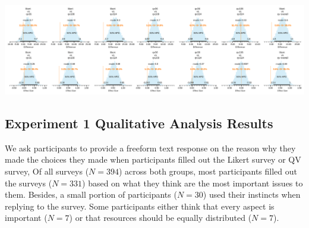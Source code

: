 \begin{landscape}
    \centering
    \includegraphics[width=1.4\textwidth, keepaspectratio=true]{content/image/Votes_vs_Absolute_Donation_StudentT_differences_and_effects.pdf}
    \label{fig:contrast_exp1}
\end{landscape}
    
\subsection{Experiment 1 Qualitative Analysis Results}\label{results-1-qual}
We ask participants to provide a freeform text response on the reason why they made the choices they made
when participants filled out the Likert survey or QV survey,
Of all surveys ($N=394$) across both groups, most participants filled out the surveys ($N=331$) based on what they think are the most important issues to them. %
Besides, a small portion of participants ($N=30$) used their instincts when replying to the survey.
Some participants either think that every aspect is important ($N=7$) or that resources should be equally distributed ($N=7$).

